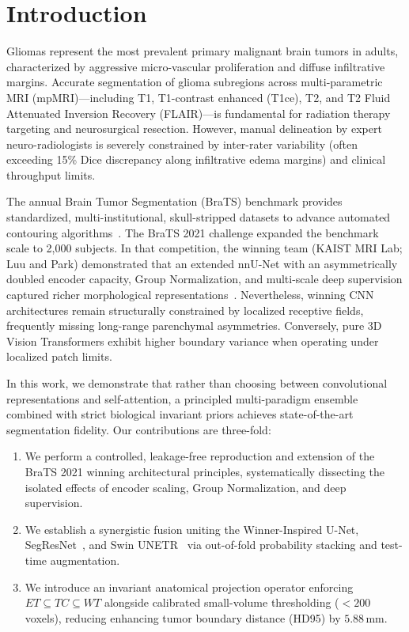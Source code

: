 \documentclass[runningheads]{llncs}
\begin{document}
\section{Introduction}
Gliomas represent the most prevalent primary malignant brain tumors in adults, characterized by aggressive micro-vascular proliferation and diffuse infiltrative margins. Accurate segmentation of glioma subregions across multi-parametric MRI (mpMRI)—including T1, T1-contrast enhanced (T1ce), T2, and T2 Fluid Attenuated Inversion Recovery (FLAIR)—is fundamental for radiation therapy targeting and neurosurgical resection. However, manual delineation by expert neuro-radiologists is severely constrained by inter-rater variability (often exceeding 15\% Dice discrepancy along infiltrative edema margins) and clinical throughput limits.

The annual Brain Tumor Segmentation (BraTS) benchmark provides standardized, multi-institutional, skull-stripped datasets to advance automated contouring algorithms~\cite{menze2014multimodal,baid2021rsna}. The BraTS 2021 challenge expanded the benchmark scale to 2,000 subjects. In that competition, the winning team (KAIST MRI Lab; Luu and Park) demonstrated that an extended nnU-Net with an asymmetrically doubled encoder capacity, Group Normalization, and multi-scale deep supervision captured richer morphological representations~\cite{luu2021extending}. Nevertheless, winning CNN architectures remain structurally constrained by localized receptive fields, frequently missing long-range parenchymal asymmetries. Conversely, pure 3D Vision Transformers exhibit higher boundary variance when operating under localized patch limits.

In this work, we demonstrate that rather than choosing between convolutional representations and self-attention, a principled multi-paradigm ensemble combined with strict biological invariant priors achieves state-of-the-art segmentation fidelity. Our contributions are three-fold:
\begin{enumerate}
    \item We perform a controlled, leakage-free reproduction and extension of the BraTS 2021 winning architectural principles, systematically dissecting the isolated effects of encoder scaling, Group Normalization, and deep supervision.
    \item We establish a synergistic fusion uniting the Winner-Inspired U-Net, SegResNet~\cite{myronenko20183d}, and Swin UNETR~\cite{hatamizadeh2022swin} via out-of-fold probability stacking and test-time augmentation.
    \item We introduce an invariant anatomical projection operator enforcing $ET \subseteq TC \subseteq WT$ alongside calibrated small-volume thresholding ($<200$ voxels), reducing enhancing tumor boundary distance (HD95) by $5.88\,\text{mm}$.
\end{enumerate}
\end{document}
